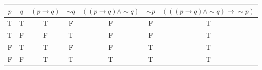 \begin{tabular}{|c|c||c|c|c|c|c|}
\hline
$ p $ & $ q $ & $ (p \rightarrow q) $ & $  \sim q $ & $ ((p \rightarrow q) \wedge  \sim q) $ & $  \sim p $ & $ (((p \rightarrow q) \wedge  \sim q) \rightarrow  \sim p) $ \\
\hline
T & T & T & F & F & F & T \\
T & F & F & T & F & F & T \\
F & T & T & F & F & T & T \\
F & F & T & T & T & T & T \\
\hline
\end{tabular}
